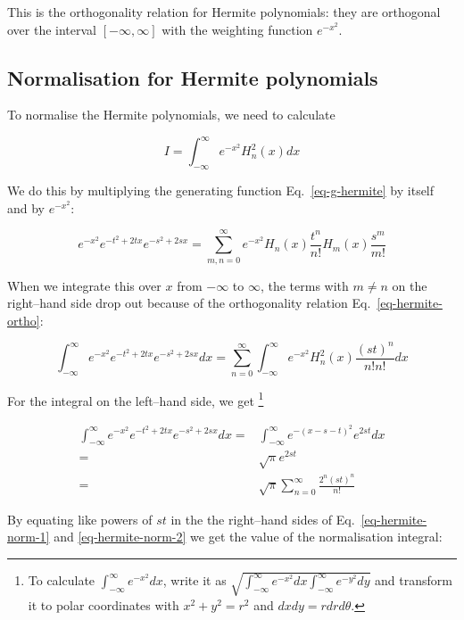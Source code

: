 This is the orthogonality relation for Hermite polynomials: they are orthogonal over the interval $[-\infty, \infty]$ with the weighting function $e^{-x^2}$.

\subsection{Normalisation for Hermite polynomials}

To normalise the Hermite polynomials, we need to calculate

\begin{equation}
I = \int_{-\infty}^{\infty}e^{-x^2}H_n^2(x)dx
\end{equation}

We do this by multiplying the generating function Eq.~\ref{eq-g-hermite} by itself and by  $e^{-x^2}$:

\begin{equation}
e^{-x^2} e^{-t^2 + 2tx} e^{-s^2 + 2sx}= \sum_{m, n = 0}^{\infty}e^{-x^2} H_n(x)\frac{t^n}{n!}H_m(x)\frac{s^m}{m!}
\end{equation} 

When we integrate this over $x$ from $-\infty$ to $\infty$, the terms with $m \ne n$ on the right--hand side drop out because of the orthogonality relation Eq.~\ref{eq-hermite-ortho}:

\begin{equation}
\int_{-\infty}^{\infty} e^{-x^2} e^{-t^2 + 2tx} e^{-s^2 + 2sx} dx= \sum_{n = 0}^{\infty} \int_{-\infty}^{\infty} e^{-x^2} H_n^2(x)\frac{(st)^n}{n!n!} dx \label{eq-hermite-norm-1}
\end{equation} 

For the integral on the left--hand side, we get \footnote{To calculate $\int_{-\infty}^{\infty}e^{-x^2}dx$, write it as $\sqrt{\int_{-\infty}^{\infty} e^{-x^2}dx\int_{-\infty}^{\infty} e^{-y^2}dy}$ and transform it to polar coordinates with $x^2+y^2=r^2$ and $dxdy = r dr d\theta$.}

\begin{align}
\int_{-\infty}^{\infty} e^{-x^2} e^{-t^2 + 2tx} e^{-s^2 + 2sx} dx 
  = & \int_{-\infty}^{\infty} e^{-(x-s-t)^2} e^{2st}dx \nonumber \\
  = & \sqrt{\pi} e^{2st} \nonumber \\
  = & \sqrt{\pi} \sum_{n = 0}^{\infty} \frac{2^n{(st)}^n}{n!}  \label{eq-hermite-norm-2}
\end{align} 

By equating like powers of $st$ in the the right--hand sides of Eq.~\ref{eq-hermite-norm-1} and \ref{eq-hermite-norm-2} we get the value of the normalisation integral:

